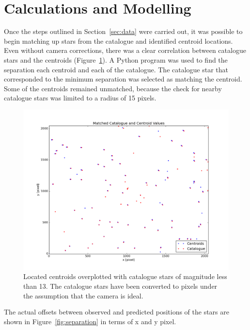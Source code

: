 \documentclass[a4paper,12pt]{article}
\begin{document}

\section{Calculations and Modelling}
\label{sec:calc}

Once the steps outlined in Section~\ref{sec:data} were carried out, it was possible to begin matching up stars from the catalogue and identified centroid locations. Even without camera corrections, there was a clear correlation between catalogue stars and the centroids (Figure~\ref{fig:catalogue}). A Python program was used to find the separation each centroid and each of the catalogue. The catalogue star that corresponded to the minimum separation was selected as matching the centroid. Some of the centroids remained unmatched, because the check for nearby catalogue stars was limited to a radius of 15 pixels.

\begin{figure}[!htbp]
\centering
\includegraphics[scale=0.35]{first_match_galaxy.png}
\caption{Located centroids overplotted with catalogue stars of magnitude less than 13. The catalogue stars have been converted to pixels under the assumption that the camera is ideal.}
\label{fig:catalogue}
\end{figure}

The actual offsets between observed and predicted positions of the stars are shown in Figure~\ref{fig:separation} in terms of x and y pixel.
\end{document}
